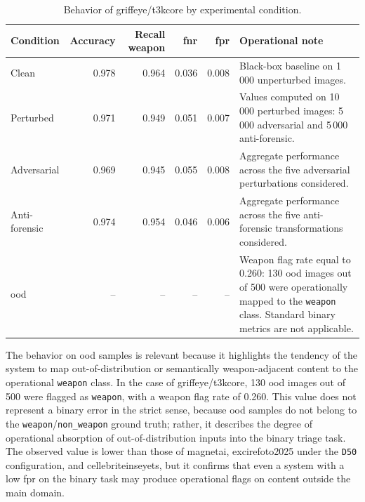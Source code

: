\begin{table}[H]
\centering
\caption{Behavior of \gls{griffeye}/\gls{t3kcore} by experimental condition.}
\label{tab:results-griffeye-condition-metrics}
\small
\begin{tabularx}{\textwidth}{@{}l r r r r X@{}}
\toprule
\textbf{Condition} &
\textbf{Accuracy} &
\textbf{Recall weapon} &
\textbf{\gls{fnr}} &
\textbf{\gls{fpr}} &
\textbf{Operational note} \\
\midrule

Clean &
0.978 &
0.964 &
0.036 &
0.008 &
Black-box baseline on 1\,000 unperturbed images. \\

Perturbed &
0.971 &
0.949 &
0.051 &
0.007 &
Values computed on 10\,000 perturbed images: 5\,000 adversarial and
5\,000 anti-forensic. \\

Adversarial &
0.969 &
0.945 &
0.055 &
0.008 &
Aggregate performance across the five adversarial perturbations considered. \\

Anti-forensic &
0.974 &
0.954 &
0.046 &
0.006 &
Aggregate performance across the five anti-forensic transformations considered. \\

\gls{ood} &
-- &
-- &
-- &
-- &
Weapon flag rate equal to 0.260: 130 \gls{ood} images out of 500 were
operationally mapped to the \texttt{weapon} class. Standard binary metrics are
not applicable. \\

\bottomrule
\end{tabularx}
\end{table}

The behavior on \gls{ood} samples is relevant because it highlights the tendency
of the system to map out-of-distribution or semantically weapon-adjacent content
to the operational \texttt{weapon} class. In the case of
\gls{griffeye}/\gls{t3kcore}, 130 \gls{ood} images out of 500 were flagged as
\texttt{weapon}, with a weapon flag rate of 0.260. This value does not represent
a binary error in the strict sense, because \gls{ood} samples do not belong to
the \texttt{weapon}/\texttt{non\_weapon} ground truth; rather, it describes the
degree of operational absorption of out-of-distribution inputs into the binary
triage task. The observed value is lower than those of \gls{magnetai},
\gls{excirefoto2025} under the \texttt{D50} configuration, and
\gls{cellebriteinseyets}, but it confirms that even a system with a low
\gls{fpr} on the binary task may produce operational flags on content outside
the main domain.

